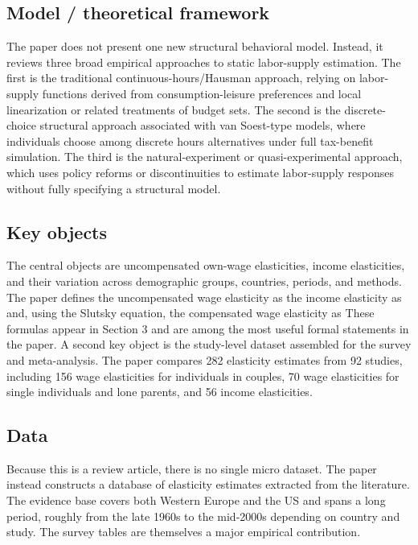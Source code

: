 \documentclass[11pt,a4paper]{article}
\begin{document}
\subsection*{Model / theoretical framework}
The paper does not present one new structural behavioral model. Instead, it reviews three broad empirical approaches to static labor-supply estimation. The first is the traditional continuous-hours/Hausman approach, relying on labor-supply functions derived from consumption-leisure preferences and local linearization or related treatments of budget sets. The second is the discrete-choice structural approach associated with van Soest-type models, where individuals choose among discrete hours alternatives under full tax-benefit simulation. The third is the natural-experiment or quasi-experimental approach, which uses policy reforms or discontinuities to estimate labor-supply responses without fully specifying a structural model.

\subsection*{Key objects}
The central objects are uncompensated own-wage elasticities, income elasticities, and their variation across demographic groups, countries, periods, and methods. The paper defines the uncompensated wage elasticity as the income elasticity as and, using the Slutsky equation, the compensated wage elasticity as These formulas appear in Section 3 and are among the most useful formal statements in the paper. A second key object is the study-level dataset assembled for the survey and meta-analysis. The paper compares 282 elasticity estimates from 92 studies, including 156 wage elasticities for individuals in couples, 70 wage elasticities for single individuals and lone parents, and 56 income elasticities.

\subsection*{Data}
Because this is a review article, there is no single micro dataset. The paper instead constructs a database of elasticity estimates extracted from the literature. The evidence base covers both Western Europe and the US and spans a long period, roughly from the late 1960s to the mid-2000s depending on country and study. The survey tables are themselves a major empirical contribution.
\end{document}
